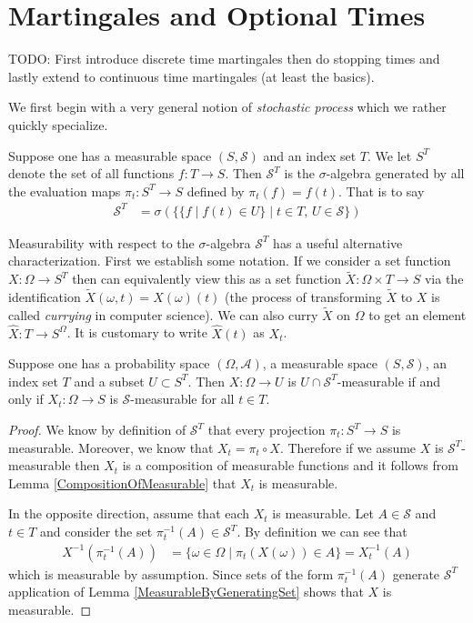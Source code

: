 \chapter{Martingales and Optional Times}
TODO:  First introduce discrete time martingales then do stopping
times and lastly extend to continuous time martingales (at least the
basics).

We first begin with a very general notion of \emph{stochastic process}
which we rather quickly specialize.  
\begin{defn}Suppose one has a measurable space $(S, \mathcal{S})$ and an
  index set $T$.  We let $S^T$ denote the set of all functions $f : T
  \to S$.  Then $\mathcal{S}^T$ is the $\sigma$-algebra generated by
  all the evaluation maps $\pi_t : S^T \to S$ defined by $\pi_t(f) =
  f(t)$.  That is to say
\begin{align*}
\mathcal{S}^T &= \sigma \left ( \lbrace \lbrace f \mid f(t) \in U
  \rbrace \mid t \in T \text{, } U \in
  \mathcal{S} \rbrace\right )
\end{align*}
\end{defn}
Measurability with respect to the $\sigma$-algebra $\mathcal{S}^T$ has a useful
alternative characterization.  First we establish some notation.  If
we consider a set function $X : \Omega \to S^T$ then can equivalently
view this as a set function $\tilde{X} : \Omega \times T \to S$ via the
identification $\tilde{X}(\omega, t) = X(\omega)(t)$ (the process of
transforming $\tilde{X}$ to $X$  is called
\emph{currying} in computer science).  We can also curry $\tilde{X}$ on $\Omega$
 to get an element $\hat{X} : T \to S^\Omega$.  It is customary to
write $\hat{X}(t)$ as $X_t$.
\begin{lem}\label{ProcessMeasurableProjections}Suppose one has a probability space $(\Omega,
  \mathcal{A})$, a measurable space $(S, \mathcal{S})$, an
  index set $T$ and a subset $U \subset S^T$.  Then $X : \Omega \to U$
  is $U \cap \mathcal{S}^T$-measurable if and only if $X_t : \Omega
  \to S$ is $\mathcal{S}$-measurable for all $t \in T$.
\end{lem}
\begin{proof}
We know by definition of $\mathcal{S}^T$ that every projection $\pi_t
: S^T \to S$ is measurable.  Moreover, we know that $X_t = \pi_t \circ
X$.  Therefore if we assume $X$ is
$\mathcal{S}^T$-measurable then $X_t$ is a composition of measurable
functions and it follows from Lemma
\ref{CompositionOfMeasurable} that $X_t$ is measurable.

In the opposite direction, assume that each $X_t$ is measurable.  Let
$A \in \mathcal{S}$ and $t \in T$ and consider the set $\pi_t^{-1}(A)
\in \mathcal{S}^T$.  By definition we can see that
\begin{align*}
X^{-1}(\pi_t^{-1}(A)) &= \lbrace \omega \in \Omega \mid
\pi_t(X(\omega)) \in A \rbrace = X_t^{-1}(A)
\end{align*}
which is measurable by assumption.  Since sets of the form
$\pi_t^{-1}(A)$ generate $\mathcal{S}^T$ application of Lemma \ref{MeasurableByGeneratingSet}
shows that $X$ is measurable.
\end{proof}

